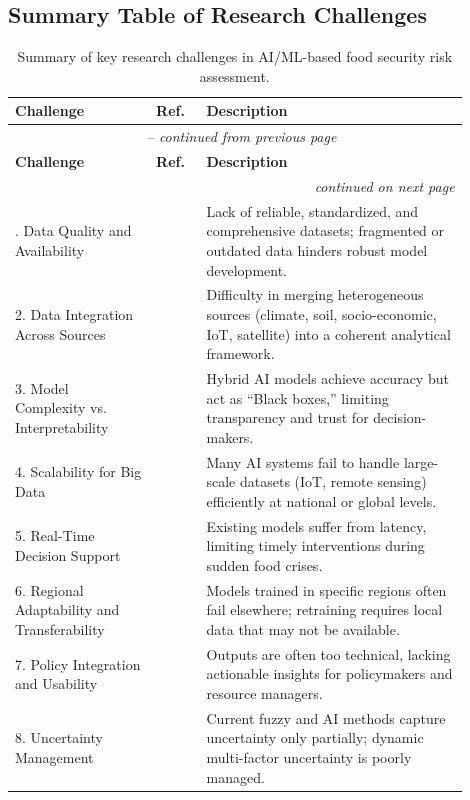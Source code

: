 \documentclass[preprint,12pt]{elsarticle}
\begin{document}
	\subsection{Summary Table of Research Challenges}
	\small
	\begin{longtable}{@{}p{0.28\linewidth}p{0.10\linewidth}p{0.52\linewidth}@{}}
		\caption{Summary of key research challenges in AI/ML-based food security risk assessment.}
		\label{tab:challenges} \\
		\toprule
		\textbf{Challenge} & \textbf{Ref.} & \textbf{Description} \\
		\midrule
		\endfirsthead
		\multicolumn{3}{c}{\tablename\ \thetable\ -- \textit{continued from previous page}} \\
		\toprule
		\textbf{Challenge} & \textbf{Ref.} & \textbf{Description} \\
		\midrule
		\endhead
		\midrule
		\multicolumn{3}{r}{\textit{continued on next page}} \\
		\endfoot
		\bottomrule
		\endlastfoot
		1. Data Quality and Availability & \cite{ref61} & Lack of reliable, standardized, and comprehensive datasets; fragmented or outdated data hinders robust model development. \\
		2. Data Integration Across Sources & \cite{ref62} & Difficulty in merging heterogeneous sources (climate, soil, socio-economic, IoT, satellite) into a coherent analytical framework. \\
		3. Model Complexity vs. Interpretability & \cite{ref9,ref4} & Hybrid AI models achieve accuracy but act as ``Black boxes,'' limiting transparency and trust for decision-makers. \\
		4. Scalability for Big Data & \cite{ref11} & Many AI systems fail to handle large-scale datasets (IoT, remote sensing) efficiently at national or global levels. \\
		5. Real-Time Decision Support & \cite{ref63} & Existing models suffer from latency, limiting timely interventions during sudden food crises. \\
		6. Regional Adaptability and Transferability & \cite{ref11} & Models trained in specific regions often fail elsewhere; retraining requires local data that may not be available. \\
		7. Policy Integration and Usability & \cite{ref4,ref63} & Outputs are often too technical, lacking actionable insights for policymakers and resource managers. \\
		8. Uncertainty Management & \cite{ref9,ref4} & Current fuzzy and AI methods capture uncertainty only partially; dynamic multi-factor uncertainty is poorly managed. \\

\end{longtable}
\end{document}

